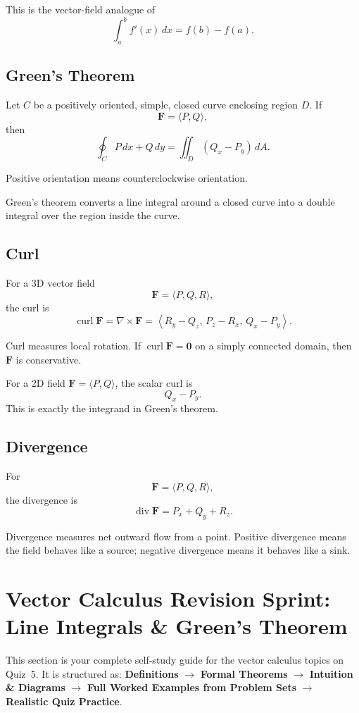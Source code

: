 \documentclass[11pt]{article}
\newcommand{\grad}{\nabla}
\newcommand{\curl}{\operatorname{curl}}
\newcommand{\divg}{\operatorname{div}}
\begin{document}
This is the vector-field analogue of
\[
\int_a^b f'(x)\,dx=f(b)-f(a).
\]

\subsection{Green's Theorem}

Let $C$ be a positively oriented, simple, closed curve enclosing region $D$. If
\[
\mathbf F=\langle P,Q\rangle,
\]
then
\[
\oint_C P\,dx+Q\,dy
=\iint_D (Q_x-P_y)\,dA.
\]

Positive orientation means counterclockwise orientation.

Green's theorem converts a line integral around a closed curve into a double integral over the region inside the curve.

\subsection{Curl}

For a 3D vector field
\[
\mathbf F=\langle P,Q,R\rangle,
\]
the curl is
\[
\curl \mathbf F
=\grad\times \mathbf F
=
\left\langle
R_y-Q_z,\,
P_z-R_x,\,
Q_x-P_y
\right\rangle.
\]

Curl measures local rotation. If $\curl \mathbf F=\mathbf 0$ on a simply connected domain, then $\mathbf F$ is conservative.

For a 2D field $\mathbf F=\langle P,Q\rangle$, the scalar curl is
\[
Q_x-P_y.
\]
This is exactly the integrand in Green's theorem.

\subsection{Divergence}

For
\[
\mathbf F=\langle P,Q,R\rangle,
\]
the divergence is
\[
\divg \mathbf F=P_x+Q_y+R_z.
\]

Divergence measures net outward flow from a point. Positive divergence means the field behaves like a source; negative divergence means it behaves like a sink.

\section{Vector Calculus Revision Sprint: Line Integrals \& Green's Theorem}

This section is your complete self-study guide for the vector calculus topics on Quiz~5.
It is structured as: \textbf{Definitions} $\to$ \textbf{Formal Theorems} $\to$ \textbf{Intuition \& Diagrams} $\to$ \textbf{Full Worked Examples from Problem Sets} $\to$ \textbf{Realistic Quiz Practice}.
\end{document}

